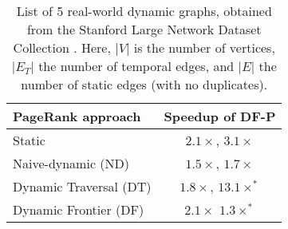 \begin{table}[hbtp]
  \centering
  \caption{List of 5 real-world dynamic graphs, obtained from the Stanford Large Network Dataset Collection \cite{snapnets}. Here, $|V|$ is the number of vertices, $|E_T|$ the number of temporal edges, and $|E|$ the number of static edges (with no duplicates).}
  \label{tab:compare}
  \begin{tabular}{|l||c|}
    \toprule
    \textbf{PageRank approach} &
    \textbf{Speedup of DF-P} \\
    \midrule
    Static \cite{rank-page99} & $2.1\times$, $3.1\times$ \\ \hline
    Naive-dynamic (ND) \cite{rank-page99, rank-zhang17} & $1.5\times$, $1.7\times$ \\ \hline
    Dynamic Traversal (DT) \cite{rank-desikan05, kim2015incremental, rank-giri20, sahu2022dynamic} & $1.8\times$, $13.1\times^*$ \\ \hline
    Dynamic Frontier (DF) \cite{sahu2024df} & $2.1\times$ $1.3\times^*$ \\ \hline
  \bottomrule
  \end{tabular}
\end{table}

